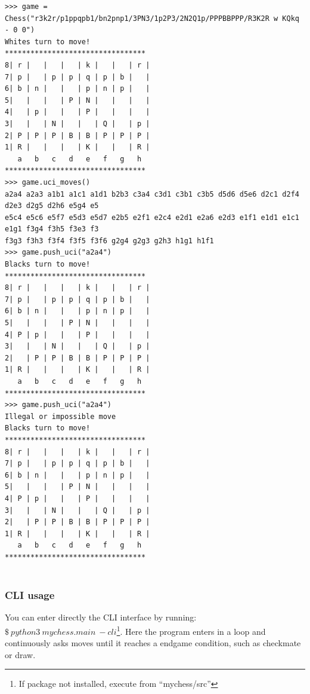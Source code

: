 \documentclass[10pt]{article}
\begin{document}
\begin{lstlisting}
>>> game = Chess("r3k2r/p1ppqpb1/bn2pnp1/3PN3/1p2P3/2N2Q1p/PPPBBPPP/R3K2R w KQkq - 0 0")
Whites turn to move!
*********************************
8| r |   |   |   | k |   |   | r |
7| p |   | p | p | q | p | b |   |
6| b | n |   |   | p | n | p |   |
5|   |   |   | P | N |   |   |   |
4|   | p |   |   | P |   |   |   |
3|   |   | N |   |   | Q |   | p |
2| P | P | P | B | B | P | P | P |
1| R |   |   |   | K |   |   | R |
   a   b   c   d   e   f   g   h
*********************************
>>> game.uci_moves()
a2a4 a2a3 a1b1 a1c1 a1d1 b2b3 c3a4 c3d1 c3b1 c3b5 d5d6 d5e6 d2c1 d2f4 d2e3 d2g5 d2h6 e5g4 e5
e5c4 e5c6 e5f7 e5d3 e5d7 e2b5 e2f1 e2c4 e2d1 e2a6 e2d3 e1f1 e1d1 e1c1 e1g1 f3g4 f3h5 f3e3 f3
f3g3 f3h3 f3f4 f3f5 f3f6 g2g4 g2g3 g2h3 h1g1 h1f1
>>> game.push_uci("a2a4")
Blacks turn to move!
*********************************
8| r |   |   |   | k |   |   | r |
7| p |   | p | p | q | p | b |   |
6| b | n |   |   | p | n | p |   |
5|   |   |   | P | N |   |   |   |
4| P | p |   |   | P |   |   |   |
3|   |   | N |   |   | Q |   | p |
2|   | P | P | B | B | P | P | P |
1| R |   |   |   | K |   |   | R |
   a   b   c   d   e   f   g   h
*********************************
>>> game.push_uci("a2a4")
Illegal or impossible move
Blacks turn to move!
*********************************
8| r |   |   |   | k |   |   | r |
7| p |   | p | p | q | p | b |   |
6| b | n |   |   | p | n | p |   |
5|   |   |   | P | N |   |   |   |
4| P | p |   |   | P |   |   |   |
3|   |   | N |   |   | Q |   | p |
2|   | P | P | B | B | P | P | P |
1| R |   |   |   | K |   |   | R |
   a   b   c   d   e   f   g   h
*********************************
    

\end{lstlisting}


\subsubsection{CLI usage}



You can enter directly the CLI interface by running:
$\$~python3~mychess.main~-cli$\footnote{If package not installed, execute from
``mychess/src''}.
Here the program enters in a loop and continuously asks moves until it reaches a
endgame condition, such as checkmate or draw.
\end{document}
